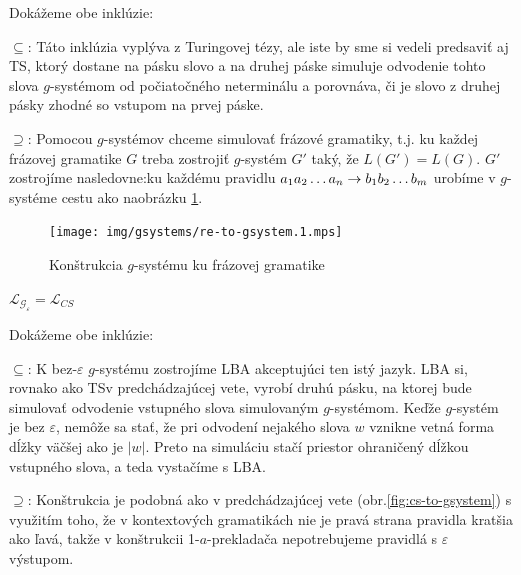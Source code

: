 \begin{dokaz}
Dokážeme obe inklúzie:
\begin{description}
\item{$\subseteq$:} Táto inklúzia vyplýva z Turingovej tézy, ale
iste by sme si vedeli predsaviť aj TS, ktorý dostane na pásku
slovo a na druhej páske simuluje odvodenie tohto slova
$g$-systémom od počiatočného neterminálu a porovnáva, či je slovo
z druhej pásky zhodné so vstupom na prvej páske.
\item{$\supseteq$:} Pomocou $g$-systémov chceme simulovať frázové gramatiky, t.j. ku každej
frázovej gramatike $G$ treba zostrojiť $g$-systém $G'$ taký, že
$L(G')=L(G)$. $G'$ zostrojíme nasledovne:\newline ku každému
pravidlu $a_1a_2\dots a_n\rightarrow b_1b_2\dots b_m$ urobíme v
$g$-systéme cestu ako na\linebreak obrázku \ref{fig:re-to-gsystem}.
\end{description}
\end{dokaz}

\begin{figure}[!ht]
    \centering
    \texttt{[image: img/gsystems/re-to-gsystem.1.mps]}
    \caption{Konštrukcia $g$-systému ku frázovej gramatike}
    \label{fig:re-to-gsystem}
\end{figure}

\pagebreak

\begin{veta}
\label{gs_veta_gre2}
$\mathcal{L}_{\mathcal{G}_\varepsilon}=\mathcal{L}_{CS}$
\end{veta}

\begin{dokaz}
Dokážeme obe inklúzie:
\begin{description}
\item{$\subseteq$:} K bez-$\varepsilon$ $g$-systému zostrojíme LBA
akceptujúci ten istý jazyk. LBA si, rovnako ako TS\linebreak v
predchádzajúcej vete, vyrobí druhú pásku, na ktorej bude simulovať
odvodenie vstupného slova simulovaným $g$-systémom. Keďže
$g$-systém je bez $\varepsilon$, nemôže sa stať, že pri odvodení
nejakého slova $w$ vznikne vetná forma dĺžky väčšej ako je $|w|$.
Preto na simuláciu stačí priestor ohraničený dĺžkou vstupného
slova, a teda vystačíme s LBA.
\item{$\supseteq$:} Konštrukcia je podobná ako v predchádzajúcej vete
(obr.\ref{fig:cs-to-gsystem}) s využitím toho, že v kontextových gramatikách nie
je pravá strana pravidla kratšia ako ľavá, takže v konštrukcii
1-$a$-prekladača nepotrebujeme pravidlá s $\varepsilon$ výstupom.
\end{description}
\end{dokaz}

